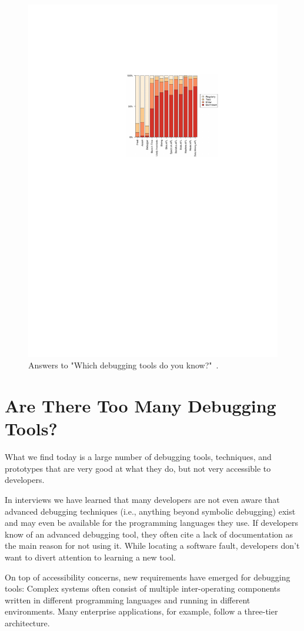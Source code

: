 \begin{figure}[th]
\centering
\includegraphics[width=.6\linewidth]{img/tool-usage}
\caption{Answers to "Which debugging tools do you know?"~\cite{perscheid_17_studying_the_advancement}.}
\label{fig:tool-usage}
\end{figure}

\section{Are There Too Many Debugging Tools?}

What we find today is a large number of debugging tools, techniques, and prototypes that are very good at what they do, but not very accessible to developers.

In interviews we have learned that many developers are not even aware that advanced debugging techniques (i.e., anything beyond symbolic debugging) exist and may even be available for the programming languages they use.
If developers know of an advanced debugging tool, they often cite a lack of documentation as the main reason for not using it.
While locating a software fault, developers don't want to divert attention to learning a new tool.


On top of accessibility concerns, new requirements have emerged for debugging tools:
Complex systems often consist of multiple inter-operating components written in different programming languages and running in different environments.
Many enterprise applications, for example, follow a three-tier architecture.

